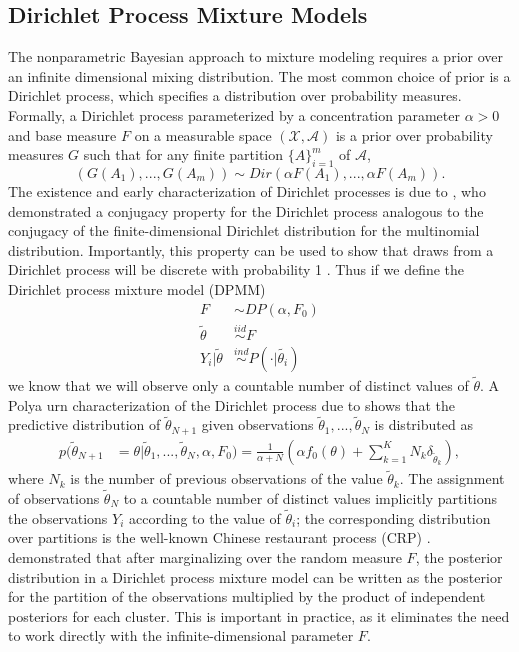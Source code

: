 \documentclass{uwstat572}
\begin{document}
\subsection{Dirichlet Process Mixture Models}

The nonparametric Bayesian approach to mixture modeling requires a prior over an infinite dimensional mixing distribution. The most common choice of prior is a Dirichlet process, which specifies a distribution over probability measures. Formally, a Dirichlet process parameterized by a concentration parameter $\alpha > 0$ and base measure $F$ on a measurable space $(\mathcal{X}, \mathcal{A})$ is a prior over probability measures $G$ such that for any finite partition $\{A\}_{i=1}^m$ of $\mathcal{A}$,
$$ (G(A_1), ...,G(A_m)) \sim Dir(\alpha F(A_1), ..., \alpha F(A_m)).$$
The existence and early characterization of Dirichlet processes is due to \cite{ferguson}, who demonstrated a conjugacy property for the Dirichlet process analogous to the conjugacy of the finite-dimensional Dirichlet distribution for the multinomial distribution. Importantly, this property can be used to show that draws from a Dirichlet process will be discrete with probability 1 \citep{sudderth}. Thus if we define the Dirichlet process mixture model (DPMM)
\begin{align} 
F &\sim DP(\alpha,F_0) \nonumber \\
\tilde{\theta} &\overset{iid}{\sim} F \nonumber \\
Y_i | \tilde{\theta} &\overset{ind}{\sim} P(\cdot | \tilde{\theta_i}) \nonumber
\end{align}
we know that we will observe only a countable number of distinct values of $\tilde{\theta}$. A Polya urn characterization of the Dirichlet process due to \cite{blackwell} shows that the predictive distribution of $\tilde{\theta}_{N+1}$ given observations $\tilde{\theta}_{1},...,\tilde{\theta}_{N}$ is distributed as
\begin{align} p(\tilde{\theta}_{N+1} &= \theta| \tilde{\theta}_{1},...,\tilde{\theta}_{N},\alpha,F_0)= \frac{1}{\alpha+N}\left(\alpha f_0(\theta) + \sum_{k=1}^K N_k\delta_{\tilde{\theta}_k} \right), \label{eq:blackwell} \end{align}
where $N_k$ is the number of previous observations of the value $\tilde{\theta}_k$. The assignment of observations $\tilde{\theta}_N$ to a countable number of distinct values implicitly partitions the observations $Y_i$ according to the value of $\tilde{\theta}_i$; the corresponding distribution over partitions is the well-known Chinese restaurant process (CRP) \citep{pitman}. \cite{lo} demonstrated that after marginalizing over the random measure $F$, the posterior distribution in a Dirichlet process mixture model can be written as the posterior for the partition of the observations multiplied by the product of independent posteriors for each cluster. This is important in practice, as it eliminates the need to work directly with the infinite-dimensional parameter $F$.
\end{document}
